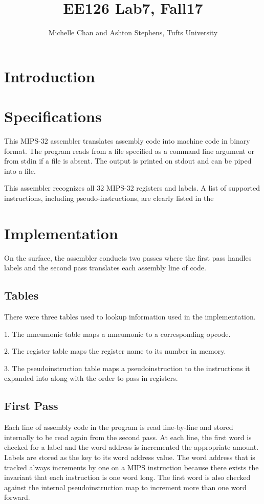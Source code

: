 \documentclass[titlepage]{article}
\title{EE126 Lab7, Fall17}
\author{Michelle Chan and Ashton Stephens, Tufts University}
\begin{document}
\begin{titlepage}
\maketitle
\end{titlepage}

\section*{Introduction}


\section*{Specifications}
This MIPS-32 assembler translates assembly code into machine code in binary
format. The program reads from a file specified as a command line argument
or from stdin if a file is absent. The output is printed on stdout and can be
piped into a file.

This assembler recognizes all 32 MIPS-32 registers and labels. A list of 
supported instructions, including pseudo-instructions, are clearly listed in the

\section*{Implementation}

On the surface, the assembler conducts two passes where the first pass handles 
labels and the second pass translates each assembly line of code. 

\subsection*{Tables}
There were three tables used to lookup information used in the implementation.

1. The mneumonic table maps a mneumonic to a corresponding opcode.

2. The register table maps the register name to its number in memory.

3. The pseudoinstruction table maps a pseudoinstruction to the instructions
it expanded into along with the order to pass in registers.

\subsection*{First Pass}
Each line of assembly code in the program is read line-by-line and stored 
internally to be read again from the second pass. At each line, the first word 
is checked for a label and the word address is incremented the appropriate 
amount. Labels are stored as the key to its word address value. The word address
that is tracked always increments by one on a MIPS instruction because there 
exists the invariant that each instruction is one word long. The first word is
also checked against the internal pseudoinstruction map to increment more than 
one word forward.
\end{document}
